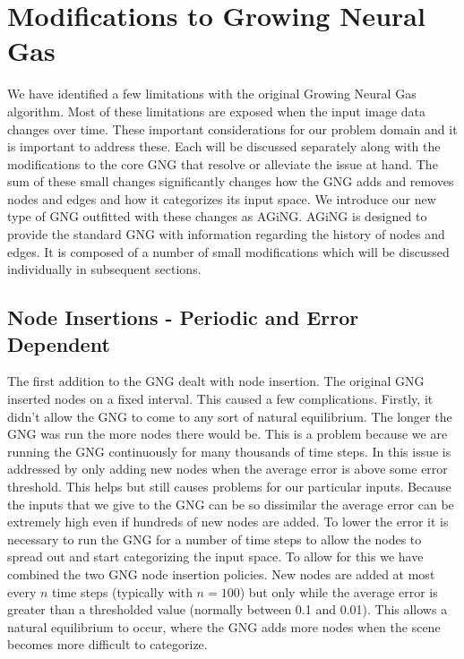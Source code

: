 \documentclass{article}
\renewcommand{\|}{\origbar} %
\begin{document}
\section{Modifications to Growing Neural Gas}
\label{sec:modificationsGNG}

We have identified a few limitations with the original Growing Neural Gas algorithm. Most of these limitations are exposed when the input image data changes over time. These important considerations for our problem domain and it is important to address these. Each will be discussed separately along with the modifications to the core GNG that resolve or alleviate the issue at hand. The sum of these small changes significantly changes how the GNG adds and removes nodes and edges and how it categorizes its input space. We introduce our new type of GNG outfitted with these changes as AGiNG. AGiNG is designed to provide the standard GNG with information regarding the history of nodes and edges. It is composed of a number of small modifications which will be discussed individually in subsequent sections.

\subsection{Node Insertions - Periodic and Error Dependent}

The first addition to the GNG dealt with node insertion. The original GNG inserted nodes on a fixed interval. This caused a few complications. Firstly, it didn't allow the GNG to come to any sort of natural equilibrium. The longer the GNG was run the more nodes there would be. This is a problem because we are running the GNG continuously for many thousands of time steps. In  this issue is addressed by only adding new nodes when the average error is above some error threshold. This helps but still causes problems for our particular inputs. Because the inputs that we give to the GNG can be so dissimilar the average error can be extremely high even if hundreds of new nodes are added. To lower the error it is necessary to run the GNG for a number of time steps to allow the nodes to spread out and start categorizing the input space. To allow for this we have combined the two GNG node insertion policies. New nodes are added at most every $n$ time steps (typically with $n = 100$) but only while the average error is greater than a thresholded value (normally between 0.1 and 0.01). This allows a natural equilibrium to occur, where the GNG adds more nodes when the scene becomes more difficult to categorize.
\end{document}
